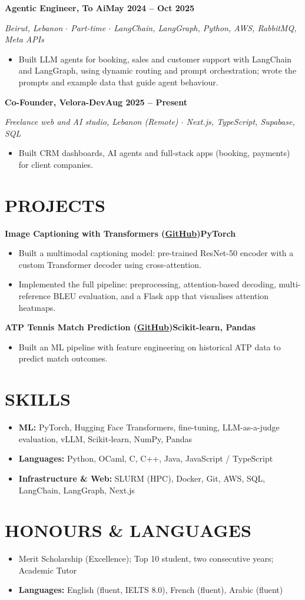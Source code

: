 \documentclass[10pt, a4paper]{article}
\newcommand{\entry}[2]{\vspace{5pt}\textbf{#1}\hfill\textbf{#2}\par}
\newcommand{\sub}[1]{\textit{#1}\par}
\begin{document}
\entry{Agentic Engineer, To Ai}{May 2024 -- Oct 2025}
\sub{Beirut, Lebanon $\cdot$ Part-time $\cdot$ LangChain, LangGraph, Python, AWS, RabbitMQ, Meta APIs}
\begin{itemize}
    \item Built LLM agents for booking, sales and customer support with LangChain and LangGraph, using dynamic routing and prompt orchestration; wrote the prompts and example data that guide agent behaviour.
\end{itemize}

\entry{Co-Founder, Velora-Dev}{Aug 2025 -- Present}
\sub{Freelance web and AI studio, Lebanon (Remote) $\cdot$ Next.js, TypeScript, Supabase, SQL}
\begin{itemize}
    \item Built CRM dashboards, AI agents and full-stack apps (booking, payments) for client companies.
\end{itemize}

\section*{PROJECTS}
\entry{Image Captioning with Transformers (\href{https://github.com/Farrous05/image-caption-transformer}{GitHub})}{PyTorch}
\begin{itemize}
    \item Built a multimodal captioning model: pre-trained ResNet-50 encoder with a custom Transformer decoder using cross-attention.
    \item Implemented the full pipeline: preprocessing, attention-based decoding, multi-reference BLEU evaluation, and a Flask app that visualises attention heatmaps.
\end{itemize}

\entry{ATP Tennis Match Prediction (\href{https://github.com/Farrous05/atp-tennis-ml}{GitHub})}{Scikit-learn, Pandas}
\begin{itemize}
    \item Built an ML pipeline with feature engineering on historical ATP data to predict match outcomes.
\end{itemize}

\section*{SKILLS}
\begin{itemize}
    \item \textbf{ML:} PyTorch, Hugging Face Transformers, fine-tuning, LLM-as-a-judge evaluation, vLLM, Scikit-learn, NumPy, Pandas
    \item \textbf{Languages:} Python, OCaml, C, C++, Java, JavaScript / TypeScript
    \item \textbf{Infrastructure \& Web:} SLURM (HPC), Docker, Git, AWS, SQL, LangChain, LangGraph, Next.js
\end{itemize}

\section*{HONOURS \& LANGUAGES}
\begin{itemize}
    \item Merit Scholarship (Excellence); Top 10 student, two consecutive years; Academic Tutor
    \item \textbf{Languages:} English (fluent, IELTS 8.0), French (fluent), Arabic (fluent)
\end{itemize}
\end{document}
